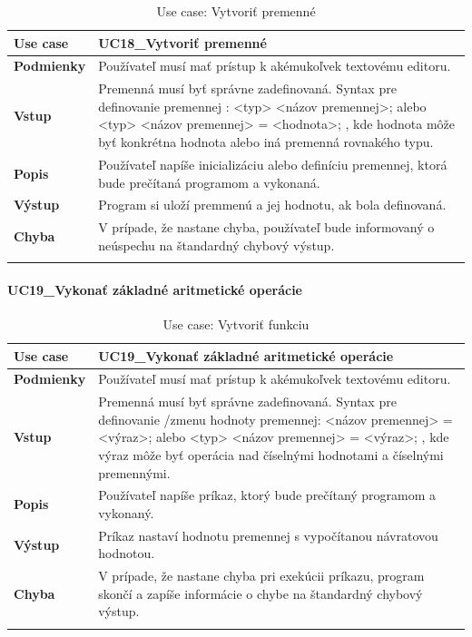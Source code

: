 {\begin{center}
\begin{longtable}{|p{2.5cm}|p{12.2cm}|}
			\hline
			\textbf{Use case} & UC18\_Vytvoriť premenné \\ 
			\hline
			\textbf{Podmienky} & Používateľ musí mať prístup k akémukoľvek textovému editoru.  \\ 
			\hline
			\textbf{Vstup} & Premenná musí byť správne zadefinovaná. 
			\newline
			Syntax pre definovanie premennej : 
			\newline
			<typ> <názov premennej>; alebo 
			\newline
			 <typ> <názov premennej> = <hodnota>;
			 \newline
			 , kde hodnota môže byť konkrétna hodnota alebo iná premenná rovnakého typu.\\
			\hline
			\textbf{Popis} & Používateľ napíše inicializáciu alebo definíciu premennej, ktorá bude prečítaná programom a vykonaná.\\ 
			\hline
			\textbf{Výstup} & Program si uloží premmenú a jej hodnotu, ak bola definovaná.\\
			\hline
			\textbf{Chyba} & V prípade, že nastane chyba, používateľ bude informovaný o neúspechu na štandardný chybový výstup.\\
			\hline
			\caption{Use case: Vytvoriť premenné}
		\label{table:1}
	
	\end{longtable}
\end{center}
\paragraph{UC19\_Vykonať základné aritmetické operácie}
\begin{center}
	\begin{longtable}{|p{2.5cm}|p{12.2cm}|}
		
			\hline
			\textbf{Use case} & UC19\_Vykonať základné aritmetické operácie \\ 
			\hline
			\textbf{Podmienky} & Používateľ musí mať prístup k akémukoľvek textovému editoru.  \\ 
			\hline
			\textbf{Vstup} & Premenná musí byť správne zadefinovaná. 
			\newline
			Syntax pre definovanie /zmenu hodnoty premennej: 
			\newline
			<názov premennej> = <výraz>; alebo 
			\newline
			<typ> <názov premennej> = <výraz>;
			\newline
			, kde výraz môže byť operácia nad číselnými hodnotami a číselnými premennými. \\
			\hline
			\textbf{Popis} & Používateľ napíše príkaz, ktorý bude prečítaný programom a vykonaný.\\ 
			\hline
			\textbf{Výstup} & Príkaz nastaví hodnotu premennej s vypočítanou návratovou hodnotou.\\
			\hline
			\textbf{Chyba} & V prípade, že nastane chyba pri exekúcii príkazu, program skončí a zapíše informácie o chybe na štandardný chybový výstup.\\
			\hline
		\caption{Use case: Vytvoriť funkciu}
		\label{table:1}
		

\end{longtable}
\end{center}}
